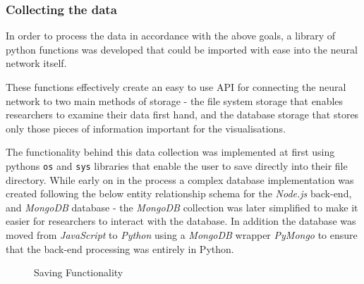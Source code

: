 \documentclass[a4paper,11pt,titlepage]{article}
\begin{document}
	\subsubsection{Collecting the data}
	\par 
	In order to process the data in accordance with the above goals, a library of python functions was developed that could be imported with ease into the neural network itself.
	\par 
	These functions effectively create an easy to use API for connecting the neural network to two main methods of storage - the file system storage that enables researchers to examine their data first hand, and the database storage that stores only those pieces of information important for the visualisations. 
	\par 
	The functionality behind this data collection was implemented at first using pythons \texttt{os} and \texttt{sys} libraries that enable the user to save directly into their file directory. While early on in the process a complex database implementation was created following the below entity relationship schema for the \textit{Node.js} back-end, and \textit{MongoDB} database - the \textit{MongoDB} collection was later simplified to make it easier for researchers to interact with the database. In addition the database was moved from \textit{JavaScript} to \textit{Python} using a \textit{MongoDB} wrapper \textit{PyMongo} to ensure that the back-end processing was entirely in Python.
	
	\begin{figure}[H]
    			\caption{Saving Functionality}%
	\end{figure}		
	
\end{document}
